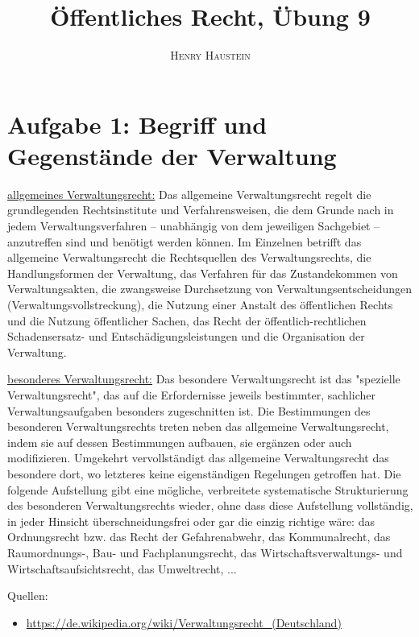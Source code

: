 \documentclass{article}
\title{\textbf{Öffentliches Recht, Übung 9}}
\author{\textsc{Henry Haustein}}
\date{}
\begin{document}
	\maketitle
	
	\section*{Aufgabe 1: Begriff und Gegenstände der Verwaltung}
	\underline{allgemeines Verwaltungsrecht:} Das allgemeine Verwaltungsrecht regelt die grundlegenden Rechtsinstitute und Verfahrensweisen, die dem Grunde nach in jedem Verwaltungsverfahren – unabhängig von dem jeweiligen Sachgebiet – anzutreffen sind und benötigt werden können. Im Einzelnen betrifft das allgemeine Verwaltungsrecht die Rechtsquellen des Verwaltungsrechts, die Handlungsformen der Verwaltung, das Verfahren für das Zustandekommen von Verwaltungsakten, die zwangsweise Durchsetzung von Verwaltungsentscheidungen (Verwaltungsvollstreckung), die Nutzung einer Anstalt des öffentlichen Rechts und die Nutzung öffentlicher Sachen, das Recht der öffentlich-rechtlichen Schadensersatz- und Entschädigungsleistungen und die Organisation der Verwaltung.
	
	\underline{besonderes Verwaltungsrecht:} Das besondere Verwaltungsrecht ist das "spezielle Verwaltungsrecht", das auf die Erfordernisse jeweils bestimmter, sachlicher Verwaltungsaufgaben besonders zugeschnitten ist. Die Bestimmungen des besonderen Verwaltungsrechts treten neben das allgemeine Verwaltungsrecht, indem sie auf dessen Bestimmungen aufbauen, sie ergänzen oder auch modifizieren. Umgekehrt vervollständigt das allgemeine Verwaltungsrecht das besondere dort, wo letzteres keine eigenständigen Regelungen getroffen hat. Die folgende Aufstellung gibt eine mögliche, verbreitete systematische Strukturierung des besonderen Verwaltungsrechts wieder, ohne dass diese Aufstellung vollständig, in jeder Hinsicht überschneidungsfrei oder gar die einzig richtige wäre: das Ordnungsrecht bzw. das Recht der Gefahrenabwehr, das Kommunalrecht, das Raumordnungs-, Bau- und Fachplanungsrecht, das Wirtschaftsverwaltungs- und Wirtschaftsaufsichtsrecht, das Umweltrecht, ...

	Quellen:
	\begin{itemize}
		\item \url{https://de.wikipedia.org/wiki/Verwaltungsrecht_(Deutschland)}
	\end{itemize}
\end{document}
